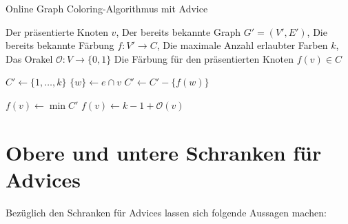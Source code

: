 \documentclass[11pt]{scrreprt} %
\theoremstyle{definition}
\begin{document}
\begin{algorithm}
\caption{Online Graph Coloring-Algorithmus mit Advice}
\label{algo.advice}
\begin{algorithmic}
\Require
	\State Der präsentierte Knoten $v$,
	\State Der bereits bekannte Graph $G' = (V', E')$,
	\State Die bereits bekannte Färbung $f : V' \rightarrow C$,
	\State Die maximale Anzahl erlaubter Farben $k$,
	\State Das Orakel $\mathcal{O} : V \rightarrow \{0,1\}$
\Ensure
	\State Die Färbung für den präsentierten Knoten $f(v) \in C$
\Statex

\State $C' \gets \{1, \dots, k\}$
	\State $\{w\} \gets e \cap v$
		\State $C' \gets C' - \{ f(w) \}$
	\EndIf
\EndFor
\EndFor

\Statex

	\State $ f(v) \gets \min C'$
\Else
	\State $ f(v) \gets k-1+\mathcal{O}(v)$
\EndIf

\end{algorithmic}
\end{algorithm}

\section{Obere und untere Schranken für Advices}

Bezüglich den Schranken für Advices lassen sich folgende Aussagen machen:
\end{document}
